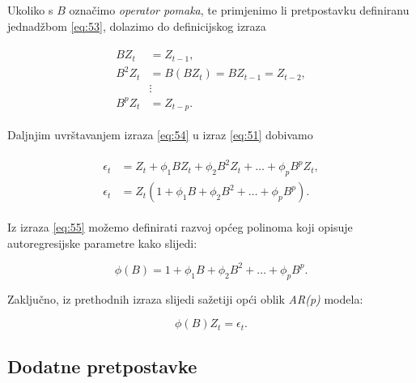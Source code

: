 \documentclass[a4paper,12pt,oneside]{memoir}
\begin{document}
            Ukoliko s $B$ označimo \textit{operator pomaka}, te primjenimo li pretpostavku definiranu jednadžbom \eqref{eq:53}, dolazimo do definicijskog izraza

            \begin{align}
                \begin{split}
                    BZ_t&=Z_{t-1},\\
                    B^2Z_t&=B(BZ_t)=BZ_{t-1}=Z_{t-2},\\
                    &\vdots\\
                    B^pZ_t&=Z_{t-p}.
                \end{split}
                \label{eq:54}
            \end{align}

            Daljnjim uvrštavanjem izraza \eqref{eq:54} u izraz \eqref{eq:51} dobivamo

            \begin{align}
                \begin{split}
                    \epsilon_t&=Z_t+\phi_1BZ_t+\phi_2B^2Z_t+\ldots+\phi_pB^pZ_t,\\
                    \epsilon_t&=Z_t(1+\phi_1B+\phi_2B^2+\ldots+\phi_pB^p).
                \end{split}
                \label{eq:55}
            \end{align}

            
        
            Iz izraza \eqref{eq:55} možemo definirati razvoj općeg polinoma koji opisuje autoregresijske parametre kako slijedi:

            \begin{equation}
                \phi(B)=1+\phi_1B+\phi_2B^2+\ldots+\phi_pB^p.
                \label{eq:56}
            \end{equation}

            Zaključno, iz prethodnih izraza slijedi sažetiji opći oblik \textit{AR(p)} modela:

            \begin{equation}
                \phi(B)Z_t=\epsilon_t.
                \label{eq:57}
            \end{equation}

            \subsection{Dodatne pretpostavke}
            
\end{document}
